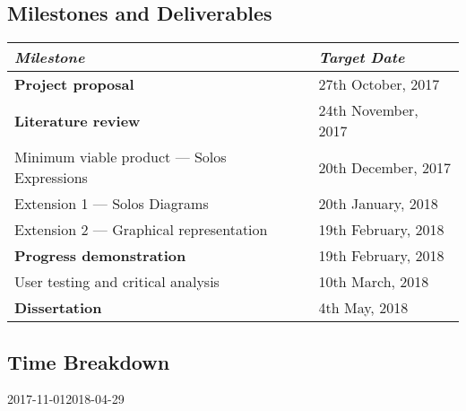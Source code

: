 \documentclass{article}
\begin{document}
\subsection{Milestones and Deliverables}
\begin{center}
	\begin{tabular}{ l l }
		\toprule
		\textit{Milestone} & \textit{Target Date} \\
		\midrule
		\textbf{Project proposal} & {27th October, 2017} \\
		\textbf{Literature review} & {24th November, 2017} \\
		{Minimum viable product --- Solos Expressions} & {20th December, 2017} \\
		{Extension 1 --- Solos Diagrams} & {20th January, 2018} \\
		{Extension 2 --- Graphical representation} & {19th February, 2018} \\
		\textbf{Progress demonstration} & {19th February, 2018} \\
		{User testing and critical analysis} & {10th March, 2018} \\
		\textbf{Dissertation} & {4th May, 2018} \\
		\bottomrule
	\end{tabular}
\end{center}

\subsection{Time Breakdown}
\begin{center}
	\begin{ganttchart}[
		hgrid,
		vgrid={*{6}{draw=none}, dotted},
		time slot format=isodate,
		y unit title=0.6cm,
		y unit chart=0.6cm,
		x unit=0.065cm,
		milestone/.append style={xscale=5},
	]{2017-11-01}{2018-04-29}
		 \\
		 \\
		 \\
		 \\
		 \\
		 \\
		 \\
		 \\
		 \\
		 \\
	\end{ganttchart}
\end{center}
\end{document}
